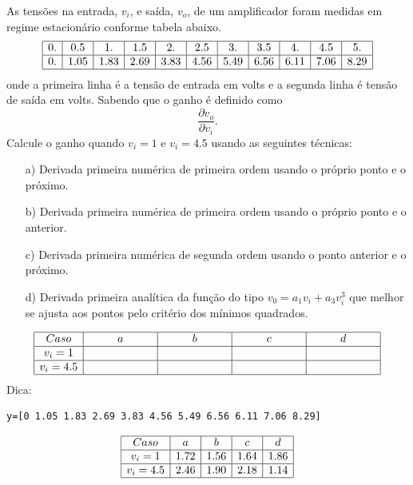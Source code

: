 \begin{Exercise} As tensões  na entrada, $v_i$, e saída, $v_o$, de um amplificador foram medidas em regime estacionário conforme tabela abaixo.
$$\begin{array}{|c|c|c|c|c|c|c|c|c|c|c|}
\hline
    0. &   0.5  &   1.   &   1.5  &   2. &     2.5   &  3.  &    3.5  &   4.  &    4.5  &   5.\\
 \hline
 0.  &  1.05  &  1.83  &  2.69  &  3.83 &   4.56 &   5.49 &   6.56  &  6.11 &   7.06  &  8.29\\
 \hline
\end{array}
$$
onde  a primeira linha é a tensão de entrada em volts e a segunda linha é tensão de saída em volts.
Sabendo que o ganho é definido como $$\frac{\partial v_o}{\partial v_i}.$$ Calcule o ganho quando $v_i=1$ e $v_i=4.5$ usando as seguintes técnicas:
\begin{itemize}
\item[a)] Derivada primeira numérica de primeira ordem usando o próprio ponto e o próximo.
\item[b)] Derivada primeira numérica de primeira ordem usando o próprio ponto e o anterior.
\item[c)] Derivada primeira numérica de segunda ordem usando o ponto anterior e o próximo.
\item[d)] Derivada primeira analítica da função do tipo $v_0=a_1 v_i + a_3 v_i^3$ que melhor se ajusta aos pontos pelo critério dos mínimos quadrados.
\end{itemize}
$$\begin{array}{|c|c|c|c|c|}
\hline
 Caso &  a  &   b &   c   &   d \\
 \hline
 v_i=1 &    & ~\hspace{50pt}~  &   & ~\hspace{50pt}~ \\
 \hline
v_i=4.5 &~\hspace{50pt}~    &   &  ~\hspace{50pt}~   &\\
 \hline
\end{array}
$$
\ifisscilab
Dica:
\begin{verbatim}
y=[0 1.05 1.83 2.69 3.83 4.56 5.49 6.56 6.11 7.06 8.29]
\end{verbatim}
\fi
\end{Exercise}
\begin{Answer}
  \begin{tiny}
$$\begin{array}{|c|c|c|c|c|}
\hline
 Caso &  a  &   b &   c   &   d \\
 \hline
 v_i=1 & 1.72   & 1.56  &  1.64 & 1.86 \\
 \hline
v_i=4.5 &2.46    & 1.90  &  2.18  &1.14  \\
 \hline
\end{array}
$$    
  \end{tiny}
\end{Answer}

